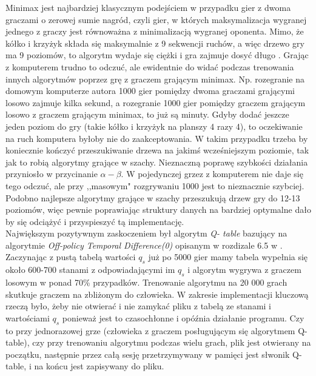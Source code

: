 \documentclass[licencjacka]{pracamgr}
\begin{document}
Minimax jest najbardziej klasycznym podejściem w przypadku gier z dwoma graczami o zerowej sumie nagród,  czyli gier, w których maksymalizacja wygranej jednego z graczy jest równoważna z minimalizacją wygranej oponenta.   Mimo, że kółko i krzyżyk składa się maksymalnie z 9 sekwencji ruchów, a więc drzewo gry ma 9 poziomów, to algorytm wydaje się ciężki i gra zajmuje dosyć długo . Grając z komputerem trudno to odczuć, ale ewidentnie do widać podczas trenowania innych algorytmów poprzez grę z graczem grającym minimax. Np. rozegranie na domowym komputerze autora 1000 gier pomiędzy dwoma graczami grającymi losowo zajmuje kilka sekund, a rozegranie 1000 gier pomiędzy graczem grającym losowo z graczem grającym minimax, to już są minuty. Gdyby dodać jeszcze jeden poziom do gry (takie kółko i krzyżyk na planszy 4 razy 4), to oczekiwanie na ruch komputera byłoby nie do zaakceptowania. W takim przypadku trzeba by koniecznie kończyć przeszukiwanie drzewa na jakimś wcześniejszym poziomie, tak jak to robią algorytmy grające w szachy.  Nieznaczną poprawę szybkości działania przyniosło w przycinanie $\alpha-\beta$. W pojedynczej grzez z komputerem nie daje się tego odczuć, ale przy ,,masowym" rozgrywaniu 1000 jest to nieznacznie szybciej. Podobno najlepsze algorytmy grające w szachy przeszukują drzew gry do 12-13 poziomów, więc pewnie poprawiając struktury danych na bardziej optymalne dało by się odciążyć i przyspieszyć tą implementację.\\

Największym pozytywnym zaskoczeniem był algorytm  \textit{Q- table} bazujący na algorytmie \textit{Off-policy Temporal Difference(0)} opisanym w rozdizale 6.5 w \cite{RL}. Zaczynając z pustą tabelą wartości $q_{s}$ już po 5000 gier mamy tabela wypełnia się około 600-700 stanami z odpowiadającymi im $q_{s}$ i algorytm wygrywa z graczem losowym w ponad 70\% przypadków. Trenowanie algorytmu na 20 000 grach skutkuje graczem na zbliżonym do człowieka. W zakresie implementacji kluczową rzeczą było, żeby nie otwierać i nie zamykać pliku z  tabelą  ze stanami i wartościami $q_{s}$ ponieważ jest to czasochłonne i opóźnia działanie programu. Czy to przy  jednorazowej grze (człowieka z graczem posługującym się algorytmem Q-table), czy przy trenowaniu algorytmu podczas wielu grach,  plik jest otwierany na początku, następnie przez całą sesję przetrzymywany w pamięci jest słwonik Q-table, i na końcu jest zapisywany do pliku.\\ 
\end{document}

